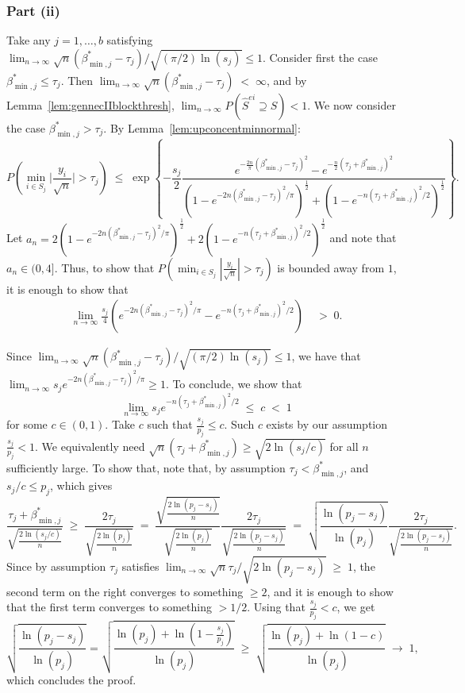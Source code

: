 \documentclass[
  12pt]{article}
\begin{document}
\subsubsection{Part (ii)}	
Take any $j=1,\ldots,b$ satisfying $\lim_{n\to \infty} \sqrt{n}(\beta_{\min,j}^*-\tau_j)/\sqrt{(\pi/2)\ln(s_j)}\leq 1$. Consider first the case $\beta^*_{\min,j}\leq\tau_j$. Then $ \lim_{n\to \infty} \sqrt{n}(\beta_{\min,j}^*-\tau_j)\; <\; \infty$, and by Lemma~\ref{lem:gennecIIblockthresh}, $\lim_{n \rightarrow \infty} P(\hat{S}^{ei}\supseteq S  ) < 1$. We now consider the case $\beta^*_{\min,j}>\tau_j$. By Lemma~\ref{lem:upconcentminnormal}:
$$P\left(\min_{i \in S_j}\Big|\frac{y_i}{\sqrt{n}}\Big| > \tau_j \right)\;\leq\;
\exp\left\{-\frac{s_j}{2}\frac{e^{-\tfrac{2n}{\pi}(\beta^*_{\min,j}-\tau_j)^2}-e^{-\tfrac{n}{2}(\tau_j+\beta^*_{\min,j})^2}}{\left(1-e^{-2n(\beta^*_{\min,j}-\tau_j)^2/\pi}\right)^{\frac{1}{2}}+\left(1-e^{-n(\tau_j+\beta^*_{\min,j})^2/2}\right)^{\frac{1}{2}}}\right\}. $$
Let $a_{n}=2\left(1-e^{-2n(\beta^*_{\min,j}-\tau_j)^2/\pi}\right)^{\frac{1}{2}}+2\left(1-e^{-n(\tau_j+\beta^*_{\min,j})^2/2}\right)^{\frac{1}{2}}$ and note that $a_n\in (0, 4]$.  Thus, to show that $P\left(\min_{i \in S_j}|\tfrac{y_i}{\sqrt{n}}| > \tau_j \right)$ is bounded away from $1$, it is enough to show that 
\begin{align*}
\lim_{n\to \infty} \frac{s_j}{4}({e^{-2n(\beta^*_{\min,j}-\tau_j)^2/\pi}-e^{-n(\tau_j+\beta^*_{\min,j})^2/2}})
&\;>\;0.
\end{align*}

Since $\lim_{n\to \infty} \sqrt{n}(\beta_{\min,j}^*-\tau_j)/\sqrt{(\pi/2)\ln(s_j)}\leq 1$, we have that $\lim_{n\to\infty} {s_j} e^{-2n(\beta^*_{\min,j}-\tau_j)^2/\pi}\geq 1$. To conclude, we show that
$$
\lim_{n\to\infty} {s_j} e^{-n(\tau_j+\beta^*_{\min,j})^2/2}\;\leq\;c\;<\;1
$$ 
for some $c\in(0,1)$. Take $c$ such that $\tfrac{s_j}{p_j}\leq c$. Such $c$ exists by our assumption $\tfrac{s_j}{p_j}<1$.
We equivalently need
$\sqrt{n}(\tau_j+\beta^*_{\min,j})\geq\sqrt{{2\ln (s_j/c)}}$ for all $n$ sufficiently large. To show that, note that, by assumption $\tau_j< \beta^*_{\min,j}$, and $s_j/c\leq p_j$, which gives
$$
\frac{\tau_j+\beta^*_{\min,j}}{\sqrt{\tfrac{2\ln(s_j/c)}{n}}}\;\geq\;\frac{2\tau_j}{\sqrt{\tfrac{2\ln(p_j)}{n}}}\;=\;\frac{\sqrt{\tfrac{2\ln(p_j-s_j)}{n}}}{\sqrt{\tfrac{2\ln(p_j)}{n}}}\frac{2\tau_j}{\sqrt{\tfrac{2\ln(p_j-s_j)}{n}}}\;=\;\sqrt{\frac{\ln(p_j-s_j)}{\ln(p_j)}}\frac{2\tau_j}{\sqrt{\tfrac{2\ln(p_j-s_j)}{n}}}.
$$
Since by assumption $\tau_j$ satisfies $\lim_{n\to \infty} \sqrt{n}\tau_j/\sqrt{2\ln(p_j-s_j)}\;\geq\;1$, the second term on the right converges to something $\geq 2$, and it is enough to show that the first term converges to something $>1/2$. Using that $\tfrac{s_j}{p_j}<c$, we get
$$
\sqrt{\frac{\ln(p_j-s_j)}{\ln(p_j)}}
= \sqrt{\frac{\ln(p_j) + \ln(1-\frac{s_j}{p_j})}{\ln(p_j)}}
\;\geq\;\sqrt{\frac{\ln(p_j)+\ln(1-c)}{\ln(p_j)}}\;\to\;1,
$$
which concludes the proof.
\end{document}
